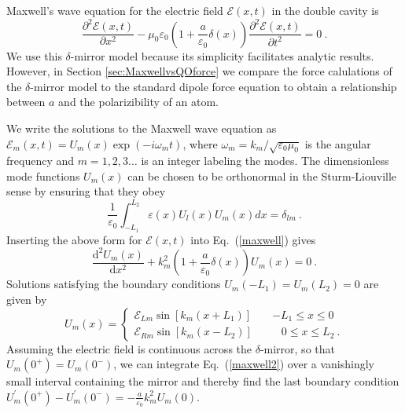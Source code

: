 \documentclass[twocolumn,english,pra,aps,superscriptaddress,floatfix]{revtex4-1}
\begin{document}
Maxwell's wave equation for the electric field $\mathcal{E}(x,t)$ in the double cavity is
\begin{equation}
\frac{\partial^{2}\mathcal{E}(x,t)}{\partial x^{2}}-\mu_{0}\varepsilon_{0}(1+\frac{a}{\varepsilon_{0}}\delta(x))\frac{\partial^{2}\mathcal{E}(x,t)}{\partial t^{2}}=0 \ .
\label{maxwell}
\end{equation}
We use this $\delta$-mirror model because its simplicity facilitates analytic results. However, in Section \ref{sec:MaxwellvsQOforce} we compare the force calulations of the $\delta$-mirror model to the standard dipole force equation to obtain a relationship between $a$ and the polarizibility of an atom.   


We write the solutions to the Maxwell wave equation as $\mathcal{E}_{m}(x,t)=U_{m}(x) \exp(-i\omega_{m}t)$,  where $\omega_{m}=k_{m}/\sqrt{\varepsilon_{0}\mu_{0}}$ is the angular frequency and $m=1,2,3 \ldots$ is an integer labeling the modes. The dimensionless mode functions $U_{m}(x)$ can be chosen to be orthonormal
in the Sturm-Liouville sense by ensuring that they obey
\begin{equation}
\frac{1}{\varepsilon_{0}}\int_{-L_{1}}^{L_{2}}\varepsilon(x)U_{l}(x)U_{m}(x)dx=\delta_{lm} \ .
\label{normalization}
\end{equation}
Inserting the above form for $\mathcal{E}(x,t)$ into Eq.\ (\ref{maxwell}) gives
\begin{equation}
\frac{\mathrm{d}^{2}U_{m}(x)}{\mathrm{d}x^{2}}+k_{m}^{2}(1+\frac{a}{\varepsilon_{0}}\delta(x))U_{m}(x)=0 \ .
\label{maxwell2}
\end{equation}
Solutions satisfying the boundary conditions $U_{m}(-L_{1})=U_{m}(L_{2})=0$
are given by
\begin{equation}
U_{m}(x)=\begin{cases}
\mathcal{E}_{Lm}\sin \left[k_{m}(x+L_{1})\right]\quad & -L_{1} \leq x\leq0\\
\mathcal{E}_{Rm}\sin \left[k_{m}(x-L_{2})\right]\quad & \,\:\:\:0 \leq x \leq L_{2} \ . \end{cases}
\label{Wavemode}
\end{equation}
Assuming the electric field is continuous across
the $\delta$-mirror, so that $U_{m}(0^{+})=U_{m}(0^{-})$, we can integrate Eq.\ (\ref{maxwell2}) over a vanishingly small interval containing the mirror and thereby find the last boundary condition
$U_{m}^{\prime}(0^{+})-U_{m}^{\prime}(0^{-})=-\frac{a}{\varepsilon_{0}} k_{m}^{2}U_{m}(0)$.
\end{document}
